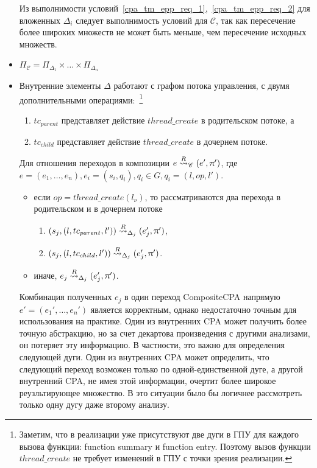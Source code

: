 \begin{itemize}
Из выполнимости условий~\ref{cpa_tm_epp_req_1},~\ref{cpa_tm_epp_req_2} для вложенных $\Delta_i$ следует выполнимость условий для $\mathscr{C}$, так как пересечение более широких множеств не может быть меньше, чем пересечение исходных множеств.

\item  $\Pi_{\mathscr{C}} = \Pi_{\Delta_1} \times \dots \times \Pi_{\Delta_n}$

\item 
Внутренние элементы $\Delta$ работают с графом потока управления, с двумя дополнительными операциями:~\footnote{Заметим, что в реализации \cpachecker уже присутствуют две дуги в ГПУ для каждого вызова функции: function summary и function entry. Поэтому вызов функции $thread\_create$ не требует изменений в ГПУ с точки зрения реализации.}
\begin{enumerate}
\item $tc_{parent}$ представляет действие $thread\_create$ в родительском потоке, а
\item $tc_{child}$ представляет действие $thread\_create$ в дочернем потоке.
\end{enumerate}

Для отношения переходов в композиции
$e \stackrel{R}{\leadsto}_{\mathscr{C}} (e',\uppi')$, где $e = (e_1, \dots, e_n), e_i = (s_i, q_i), q_i \in G, q_i=(l,op,l')$.

\begin{itemize}
\item если $op=thread\_create(l_\nu)$, то рассматриваются два перехода в родительском и в дочернем потоке
\begin{enumerate}
\item $(s_j, (l, tc_{parent}, l')) \stackrel{R}{\leadsto}_{\Delta_j} (e_j',\uppi')$,
\item $(s_j, (l, tc_{child}, l')) \stackrel{R}{\leadsto}_{\Delta_j} (e_j',\uppi')$.
\end{enumerate}
\item иначе, $e_j \stackrel{R}{\leadsto}_{\Delta_j} (e_j',\uppi')$.
\end{itemize}

Комбинация полученных $e_j$ в один переход CompositeCPA напрямую $e' = (e_1', \dots, e_n')$ является корректным, однако недостаточно точным для использования на практике. 
Один из внутренних CPA может получить более точную абстракцию, но за счет декартова произведения с другими анализами, он потеряет эту информацию. 
В частности, это важно для определения следующей дуги. Один из внутренних CPA может определить, что следующий переход возможен только по одной-единственной дуге, а другой внутренний CPA, не имея этой информации, очертит более широкое реузльтирующее множество.
В это ситуации было бы логичнее рассмотреть только одну дугу даже второму анализу.


\end{itemize}
